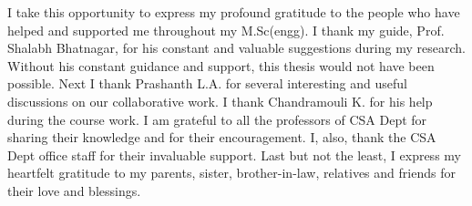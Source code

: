 I take this opportunity to express my profound gratitude to the people who have helped and supported me throughout my M.Sc(engg). I thank my guide, Prof. Shalabh Bhatnagar, for his constant and valuable suggestions during my research. Without his constant guidance and support, this thesis would not have been possible. Next I thank Prashanth L.A. for several interesting and useful discussions on our collaborative work. I thank Chandramouli K. for his help during the course work. I am grateful to all the professors of CSA Dept for sharing their knowledge and for their encouragement.  I, also, thank the CSA Dept office staff for their invaluable support. Last but not the least, I express my heartfelt gratitude to  my parents, sister, brother-in-law, relatives and friends for their love and blessings.



